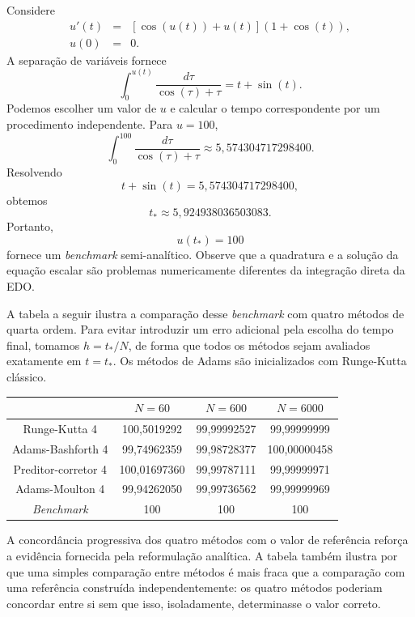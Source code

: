 \begin{ex}
Considere
\begin{eqnarray}
u'(t)&=&[\cos(u(t))+u(t)](1+\cos(t)),\\
u(0)&=&0.
\end{eqnarray}
A separação de variáveis fornece
\begin{equation}
\int_0^{u(t)}\frac{d\tau}{\cos(\tau)+\tau}=t+\sin(t).
\end{equation}
Podemos escolher um valor de $u$ e calcular o tempo correspondente por um procedimento independente. Para $u=100$,
\begin{equation}
\int_0^{100}\frac{d\tau}{\cos(\tau)+\tau}
\approx5,574304717298400.
\end{equation}
Resolvendo
\begin{equation}
t+\sin(t)=5,574304717298400,
\end{equation}
obtemos
\begin{equation}
t_*\approx5,924938036503083.
\end{equation}
Portanto,
\begin{equation}
u(t_*)=100
\end{equation}
fornece um {\it benchmark} semi-analítico. Observe que a quadratura e a solução da equação escalar são problemas numericamente diferentes da integração direta da EDO.

A tabela a seguir ilustra a comparação desse {\it benchmark} com quatro métodos de quarta ordem. Para evitar introduzir um erro adicional pela escolha do tempo final, tomamos $h=t_*/N$, de forma que todos os métodos sejam avaliados exatamente em $t=t_*$. Os métodos de Adams são inicializados com Runge-Kutta clássico.

\begin{center}
\begin{tabular}{|c|c|c|c|}
\hline
&$N=60$&$N=600$&$N=6000$\\
\hline
Runge-Kutta 4&100,5019292&99,99992527&99,99999999\\
\hline
Adams-Bashforth 4&99,74962359&99,98728377&100,00000458\\
\hline
Preditor-corretor 4&100,01697360&99,99787111&99,99999971\\
\hline
Adams-Moulton 4&99,94262050&99,99736562&99,99999969\\
\hline
{\it Benchmark}&100&100&100\\
\hline
\end{tabular}
\end{center}

A concordância progressiva dos quatro métodos com o valor de referência reforça a evidência fornecida pela reformulação analítica. A tabela também ilustra por que uma simples comparação entre métodos é mais fraca que a comparação com uma referência construída independentemente: os quatro métodos poderiam concordar entre si sem que isso, isoladamente, determinasse o valor correto.
\end{ex}


